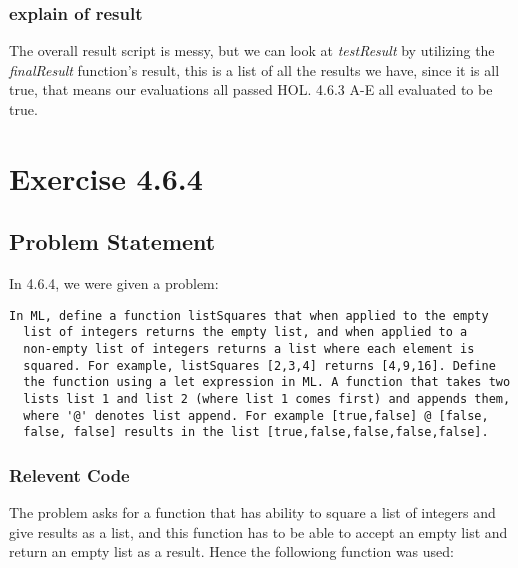 \documentclass{report}
\begin{document}
\subsection{explain of result}
\label{sec:explain-result}
The overall result script is messy, but we can look at
\emph{testResult} by utilizing the \emph{finalResult} function's
result, this is a list of all the results we have, since it is all
true, that means our evaluations all passed HOL.
4.6.3 A-E all evaluated to be true.


\chapter{Exercise 4.6.4}
\label{cha:exercise-4.6.4}



\section{Problem Statement}
\label{sec:problem-statement}

In 4.6.4, we were given a problem:
\lstset{frameround=ffff}
\begin{lstlisting}[frame=trbl]
  In ML, define a function listSquares that when applied to the empty
  list of integers returns the empty list, and when applied to a
  non-empty list of integers returns a list where each element is
  squared. For example, listSquares [2,3,4] returns [4,9,16]. Define
  the function using a let expression in ML. A function that takes two
  lists list 1 and list 2 (where list 1 comes first) and appends them,
  where '@' denotes list append. For example [true,false] @ [false,
  false, false] results in the list [true,false,false,false,false].
\end{lstlisting}


\subsection{Relevent Code}
\label{sec:relevent-code}

The problem asks for a function that has ability to square a list of integers and give results as a list, and this function has to be able to accept an empty list and return an empty list as a result. Hence the followiong function was used:
\end{document}
